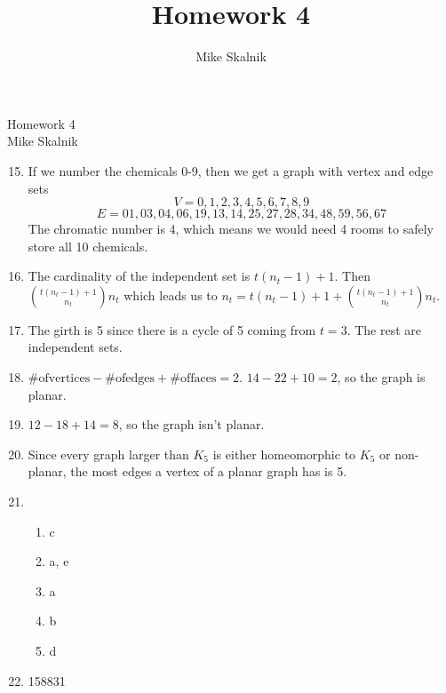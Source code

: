 \documentclass[12pt]{article}
\title{Homework 4}
\author{Mike Skalnik}
\newcommand{\s}[1]{\setcounter{enumi}{#1}}
\begin{document}
\begin{flushright}{\large Homework 4\\ Mike Skalnik}\end{flushright}

\begin{enumerate}
  \s{14}
  \item If we number the chemicals 0-9, then we get a graph with vertex and edge sets  $$V = {0, 1, 2, 3, 4, 5, 6, 7, 8, 9}$$ $$E = {01, 03, 04, 06, 19, 13, 14, 25, 27, 28, 34, 48, 59, 56, 67}$$
  The chromatic number is 4, which means we would need 4 rooms to safely store all 10 chemicals.


  \s{20}

  \item The cardinality of the independent set is $t \left( n_t -1 \right) +1$. Then $\binom{t\left(n_t -1 \right) +1}{n_t} n_t$ which leads us to $n_t = t\left(n_t-1\right) +1 + \binom{t\left(n_t-1\right)+1}{n_t} n_t$.

  \s{22}

  \item The girth is 5 since there is a cycle of 5 coming from $t=3$. The rest are independent sets.

  \s{27}
  
  \item $\mathrm{\# of vertices} - \mathrm{\# of edges} + \mathrm{\# of faces} = 2$. $14-22+10=2$, so the graph is planar.
  \item $12-18+14=8$, so the graph isn't planar.

  \s{31}

  \item Since every graph larger than $K_5$ is either homeomorphic to $K_5$ or non-planar, the most edges a vertex of a planar graph has is 5.

  \item
    \begin{enumerate}
      \item c
      \item a, e
      \item a
      \item b
      \item d
    \end{enumerate}

  \s{37}
  \item 158831


\end{enumerate}
\end{document}
